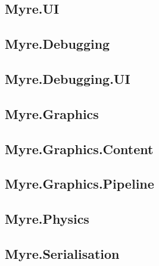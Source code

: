 \documentclass{article}
\begin{document}
\subsection{Myre.UI}
\subsection{Myre.Debugging}
\subsection{Myre.Debugging.UI}
\subsection{Myre.Graphics}
\subsection{Myre.Graphics.Content}
\subsection{Myre.Graphics.Pipeline}
\subsection{Myre.Physics}
\subsection{Myre.Serialisation}
\end{document}
